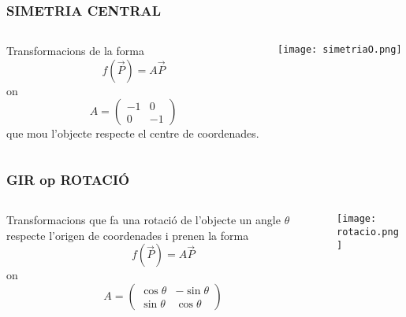 \documentclass{beamer}
\begin{document}
\begin{frame}
  \frametitle{SIMETRIA CENTRAL}
  \begin{columns}
    \begin{column}{0.5\textwidth}
      \begin{definicio}
        Transformacions de la forma
        \[
        f(\overrightarrow{P})=A \overrightarrow{P}
        \]
        on
        \[A = \begin{pmatrix}-1&0\\0&-1\end{pmatrix}\]
        que mou l'objecte respecte el centre de coordenades.
      \end{definicio}
    \end{column}
    \begin{column}{0.5\textwidth}
      \begin{center}
        \texttt{[image: simetriaO.png]}
      \end{center}
    \end{column}
  \end{columns}
\end{frame}
\begin{frame}
  \frametitle{GIR op ROTACIÓ}
  \begin{columns}
    \begin{column}{0.5\textwidth}
      \begin{definicio}
        Transformacions que fa una rotació de l'objecte un angle $\theta$ respecte l'origen de coordenades i prenen la forma
        \[
        f(\overrightarrow{P})=A \overrightarrow{P}
        \]
        on
        \[
        A = \begin{pmatrix}\cos{\theta}&-\sin{\theta}\\\sin{\theta}&\cos{\theta}\end{pmatrix}
        \]
      \end{definicio}
    \end{column}
    \begin{column}{0.5\textwidth}
      \begin{center}
        \texttt{[image: rotacio.png]}
      \end{center}
    \end{column}
  \end{columns}
\end{frame}
\end{document}

